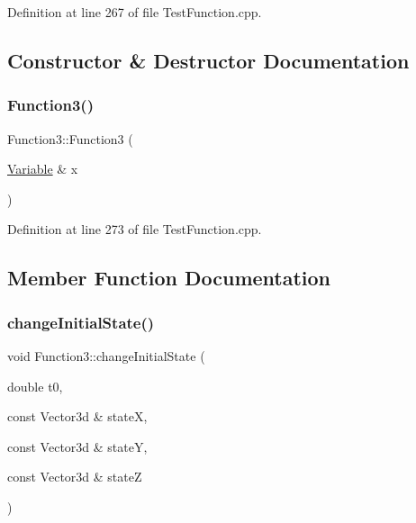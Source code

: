 Definition at line 267 of file Test\+Function.\+cpp.



\subsection{Constructor \& Destructor Documentation}
\hypertarget{classFunction3_a57fce7c38791ee3c72951a4d0ac510e5}{}\label{classFunction3_a57fce7c38791ee3c72951a4d0ac510e5} 
\subsubsection{\texorpdfstring{Function3()}{Function3()}}
{\footnotesize\ttfamily Function3\+::\+Function3 (\begin{DoxyParamCaption}\item[{\hyperlink{classocra_1_1Variable}{Variable} \&}]{x }\end{DoxyParamCaption})\hspace{0.3cm}{\ttfamily [inline]}}



Definition at line 273 of file Test\+Function.\+cpp.



\subsection{Member Function Documentation}
\hypertarget{classFunction3_a239a319d61236aa9b9375a595bf2beb9}{}\label{classFunction3_a239a319d61236aa9b9375a595bf2beb9} 
\subsubsection{\texorpdfstring{change\+Initial\+State()}{changeInitialState()}}
{\footnotesize\ttfamily void Function3\+::change\+Initial\+State (\begin{DoxyParamCaption}\item[{double}]{t0,  }\item[{const Vector3d \&}]{stateX,  }\item[{const Vector3d \&}]{stateY,  }\item[{const Vector3d \&}]{stateZ }\end{DoxyParamCaption})\hspace{0.3cm}{\ttfamily [inline]}}



